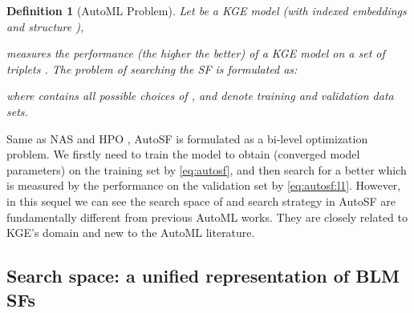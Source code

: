 \documentclass[conference]{IEEEtran}
\newtheorem{definition}{Definition}
\begin{document}
\begin{definition}[AutoML Problem]\label{def:autoSF}
Let  be a KGE model (with indexed embeddings  and structure ),
 
measures the performance (the higher the better) of a KGE model  on a set of triplets .
The problem of searching the SF is formulated as:

where  contains all possible choices of ,
 and 
denote training and validation data sets.
\end{definition}

Same as NAS \cite{xie2017genetic,zoph2017neural} 
and HPO \cite{feurer2015efficient,falkner2018bohb},
AutoSF is formulated as a bi-level optimization problem.
We firstly need to train the model to obtain  (converged model parameters) 
on the training set  by \eqref{eq:autosf},
and then search for a better 
which is measured by the performance  on the validation set 
by \eqref{eq:autosf:l1}.
However,
in this sequel
we can see the search space of  and search strategy in AutoSF are
fundamentally different from previous AutoML works.
They are closely related to KGE's domain and new to the AutoML literature.





\subsection{Search space: a unified representation of BLM SFs}
\label{ssec:unified}
\end{document}
